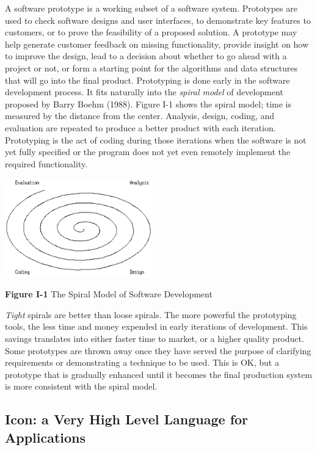 A software prototype is a working subset of a software
system. Prototypes are used to check software designs and user
interfaces, to demonstrate key features to customers, or to prove the
feasibility of a proposed solution. A prototype may help generate
customer feedback on missing functionality, provide insight on how to
improve the design, lead to a decision about whether to go ahead with a
project or not, or form a starting point for the algorithms and data
structures that will go into the final product. Prototyping is done
early in the software development process. It fits naturally into the
\textit{spiral model} of development proposed by
Barry Boehm (1988). Figure I-1 shows the spiral
model; time is measured by the distance from the center. Analysis,
design, coding, and evaluation are repeated to produce a better product
with each iteration. {\textquotedbl}Prototyping{\textquotedbl} is the
act of coding during those iterations when the software is not yet
fully specified or the program does not yet even remotely implement the
required functionality.

\begin{center}
\includegraphics[width=2.5402in,height=1.6799in]{ub-img/ub-img4.png}
\end{center}

{\sffamily\bfseries Figure I-1}
{\sffamily The Spiral Model of Software Development}

\bigskip

\textit{Tight} spirals are better than loose spirals. The more powerful
the prototyping tools, the less time and money expended in early
iterations of development. This savings translates into either faster
time to market, or a higher quality product. Some prototypes are thrown
away once they have served the purpose of clarifying requirements or
demonstrating a technique to be used. This is OK, but a prototype that
is gradually enhanced until it becomes the final production system is
more consistent with the spiral model.

\subsection{Icon: a Very High Level Language for Applications}

